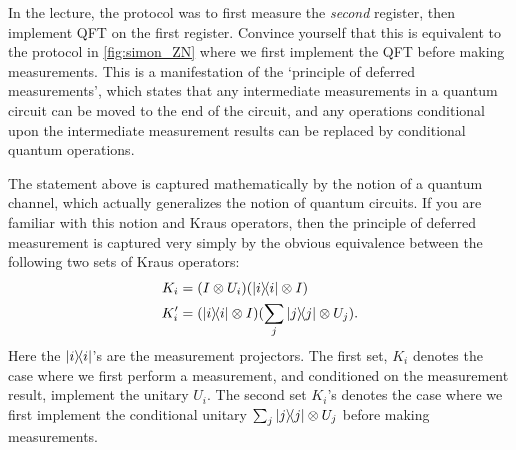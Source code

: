 \begin{remark}
    In the lecture, the protocol was to first measure the \textit{second} register, then implement QFT on the first register. Convince yourself that this is equivalent to the protocol in \cref{fig:simon_ZN} where we first implement the QFT before making measurements. This is a manifestation of the `principle of deferred measurements', which states that any intermediate measurements in a quantum circuit can be moved to the end of the circuit, and any operations conditional upon the intermediate measurement results can be replaced by conditional quantum operations.

    The statement above is captured mathematically by the notion of a quantum channel, which actually generalizes the notion of quantum circuits. If you are familiar with this notion and Kraus operators, then the principle of deferred measurement is captured very simply by the obvious equivalence between the following two sets of Kraus operators:
    \begin{align*}
        K_i &= (I \otimes U_i)(\ketbra{i}{i} \otimes I)\\
        K_i' &= (\ketbra{i}{i} \otimes I)(\sum_j \ketbra{j}{j} \otimes U_j).
    \end{align*}
    Here the $\ketbra{i}{i}$'s are the measurement projectors. The first set, $K_i$ denotes the case where we first perform a measurement, and conditioned on the measurement result, implement the unitary $U_i$. The second set $K_i$'s denotes the case where we first implement the conditional unitary $\sum_j \ketbra{j}{j} \otimes U_j$ before making measurements.
    
\end{remark}
